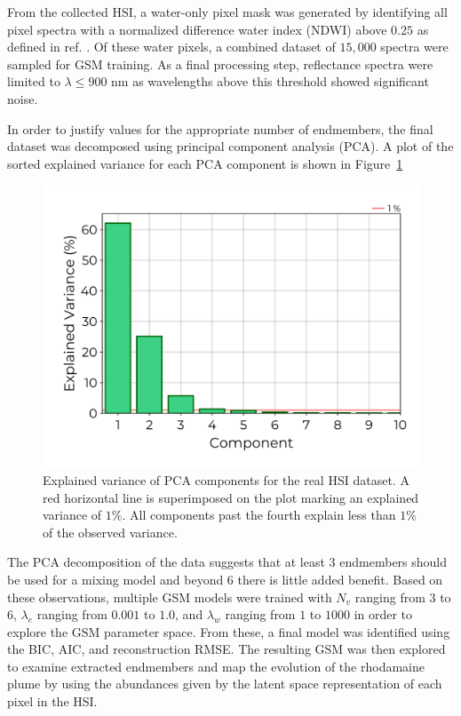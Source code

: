 \documentclass[remotesensing,article,submit,pdftex,moreauthors]{Definitions/mdpi}
\begin{document}
From the collected HSI, a water-only pixel mask was generated by identifying all pixel spectra with a normalized difference water index (NDWI) above $0.25$ as defined in ref. \cite{ndwi}. Of these water pixels, a combined dataset of $15,000$ spectra were sampled for GSM training. As a final processing step, reflectance spectra were limited to $\lambda \leq 900$ nm as wavelengths above this threshold showed significant noise.

In order to justify values for the appropriate number of endmembers, the final dataset was decomposed using principal component analysis (PCA). A plot of the sorted explained variance for each PCA component is shown in Figure~\ref{fig:robot-team-pca}
\begin{figure}[H]
\begin{center}
\includegraphics[width=0.60\columnwidth]{results/robot-team/pca-variance.png}
\end{center}
\vspace{-20pt}
\caption{Explained variance of PCA components for the real HSI dataset. A red horizontal line is superimposed on the plot marking an explained variance of $1\%$. All components past the fourth explain less than $1\%$ of the observed variance.}
\label{fig:robot-team-pca}
\end{figure}  
The PCA decomposition of the data suggests that at least $3$ endmembers should be used for a mixing model and beyond $6$ there is little added benefit. Based on these observations, multiple GSM models were trained with $N_v$ ranging from $3$ to $6$, $\lambda_e$ ranging from $0.001$ to $1.0$, and $\lambda_w$ ranging from $1$ to $1000$ in order to explore the GSM parameter space. From these, a final model was identified using the BIC, AIC, and reconstruction RMSE. The resulting GSM was then explored to examine extracted endmembers and map the evolution of the rhodamaine plume by using the abundances given by the latent space representation of each pixel in the HSI.
\end{document}
